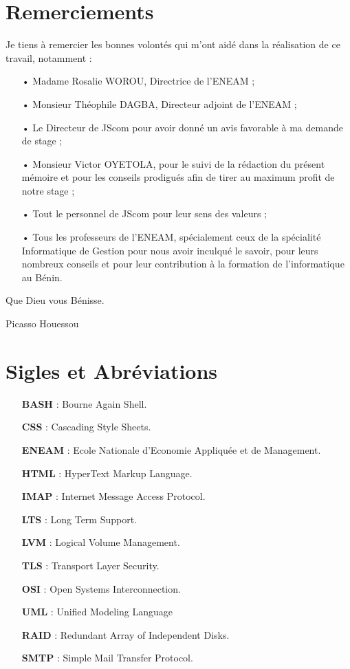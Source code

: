 \documentclass[a4paper,12pt,french]{report} %
\begin{document}
\chapter*{Remerciements}
	Je tiens à remercier les bonnes volontés qui m'ont aidé dans la réalisation de ce travail, notamment :
\begin{itemize}
	\item[•] Madame Rosalie WOROU, Directrice de l'ENEAM ;
 	\item[•] Monsieur Théophile DAGBA, Directeur adjoint de l'ENEAM ;
	\item[•] Le Directeur de JScom pour avoir donné un avis favorable à ma demande de stage ;
	\item[•] Monsieur Victor OYETOLA, pour le suivi de la rédaction du présent mémoire et pour les conseils prodigués afin de tirer au maximum profit de notre stage ;
	\item[•] Tout le personnel de JScom pour leur sens des valeurs ;
	\item[•] Tous les professeurs de l'ENEAM, spécialement ceux de la spécialité Informatique de Gestion pour nous avoir inculqué le savoir, pour leurs nombreux conseils et pour leur contribution à la formation de l'informatique au Bénin.	
\end{itemize}
Que Dieu vous Bénisse.
\begin{flushright}
Picasso Houessou
\end{flushright}

\chapter*{Sigles et Abréviations}
\begin{itemize}
\item[] \textbf{BASH} : Bourne Again Shell.
\item[] \textbf{CSS} : Cascading Style Sheets.
\item[] \textbf{ENEAM} : Ecole Nationale d'Economie Appliquée et de Management. %
\item[] \textbf{HTML} : HyperText Markup Language. %
\item[] \textbf{IMAP} : Internet Message Access Protocol.
\item[] \textbf{LTS} : Long Term Support.
\item[] \textbf{LVM} :  Logical Volume Management. %
\item[] \textbf{TLS} : Transport Layer Security.
\item[] \textbf{OSI} : Open Systems Interconnection.
\item[] \textbf{UML} : Unified Modeling Language 
\item[] \textbf{RAID} : Redundant Array of Independent Disks. %
\item[] \textbf{SMTP} : Simple Mail Transfer Protocol.
\end{itemize}
\end{document}
